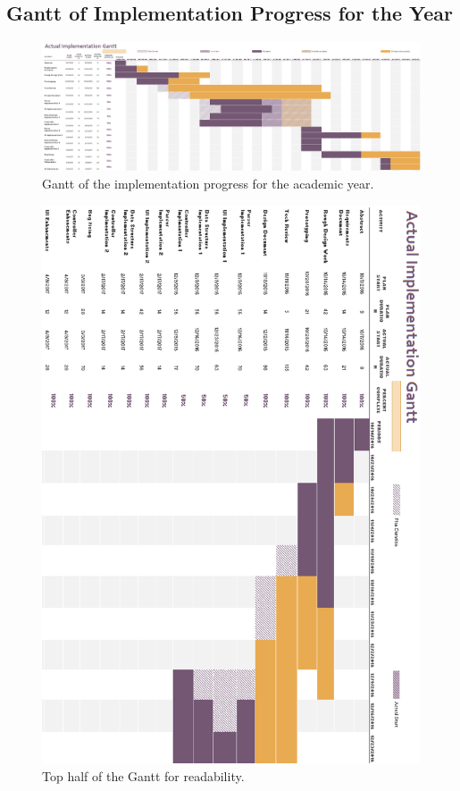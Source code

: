 \documentclass[letterpaper,10pt,titlepage,draftclsnofoot,onecolumn,onesided] {IEEEtran}
\begin{document}
\subsection{Gantt of Implementation Progress for the Year}
\begin{figure}[H]
	\centering
	\includegraphics[width=1.1\textwidth]{Gantt}
	\caption{Gantt of the implementation progress for the academic year.}
\end{figure}
\begin{figure}[H]
	\centering
	\includegraphics[width=.95\textwidth]{GanttTop}
	\caption{Top half of the Gantt for readability.}
\end{figure}
\end{document}
